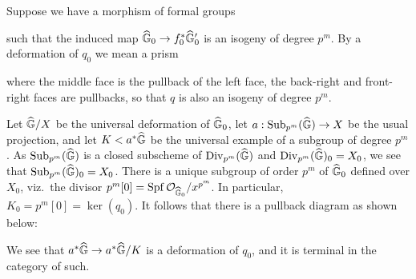 \begin{definition}
Suppose we have a morphism of formal groups
\begin{center}
\end{center}
such that the induced map $\widehat{\mathbb G}_0 \to f_0^* \widehat{\mathbb G}'_0$ is an isogeny of degree $p^m$.  By a deformation of $q_0$ we mean a prism
\begin{center}
\end{center}
where the middle face is the pullback of the left face, the back-right and front-right faces are pullbacks, so that $q$ is also an isogeny of degree $p^m$.
\end{definition}

Let $\widehat{\mathbb G}/X$ be the universal deformation of $\widehat{\mathbb G}_0$, let $a: \operatorname{Sub}_{p^m}(\widehat{\mathbb G}) \to X$ be the usual projection, and let $K < a^* \widehat{\mathbb G}$ be the universal example of a subgroup of degree $p^m$.  As $\operatorname{Sub}_{p^m}(\widehat{\mathbb G})$ is a closed subscheme of $\operatorname{Div}_{p^m}(\widehat{\mathbb G})$ and $\operatorname{Div}_{p^m}(\widehat{\mathbb G})_0 = X_0$, we see that $\operatorname{Sub}_{p^m}(\widehat{\mathbb G})_0 = X_0$.  There is a unique subgroup of order $p^m$ of $\widehat{\mathbb G}_0$ defined over $X_0$, viz.\ the divisor $p^m[0] = \operatorname{Spf} \mathcal{O}_{\widehat{\mathbb G}_0} / x^{p^m}$.  In particular, $K_0 = p^m[0] = \ker(q_0)$.  It follows that there is a pullback diagram as shown below:
\begin{center}
\end{center}
We see that $a^* \widehat{\mathbb G} \to a^* \widehat{\mathbb G}/K$ is a deformation of $q_0$, and it is terminal in the category of such.


